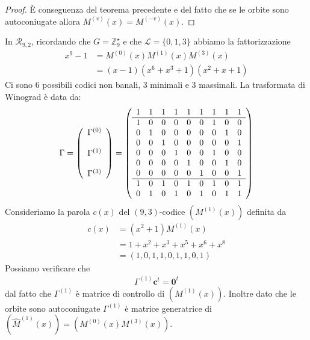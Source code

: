 \begin{proof}
    È conseguenza del teorema precedente e del fatto che se le orbite sono autoconiugate allora $M^{(v)}(x) = M^{(-v)}(x)$.
\end{proof}
\begin{esempio}
   In $\mathcal{R}_{9,2}$, ricordando che $ G = \mathbb{Z}_{9}^{\star}  $ e che $\mathscr{L} = \lbrace 0,1,3 \rbrace$ abbiamo la fattorizzazione
    \begin{align*}
      x^9 - 1 &= M^{(0)}(x) M^{(1)}(x) M^{(3)}(x) \\
	      &= (x-1)(x^6+x^3+1)(x^2+x+1)
    \end{align*}
   Ci sono $6$ possibili codici non banali, $3$ minimali e $3$ massimali.
   La trasformata di Winograd è data da:
   \begin{align*}
    \Gamma = 
     \left(
    \begin{array} { c }
    \Gamma^{(0)} \\ \\
    \Gamma^{(1)} \\ \\
    \Gamma^{(3)} 
    \end{array}
    \right)
    =
    \left(
    \begin{array} { c c c c c c c c c}
    1 & 1 & 1 & 1 & 1 & 1 & 1 & 1 & 1  \\
    \hline
    1 & 0 & 0 & 0 & 0 & 0 & 1 & 0 & 0  \\
    0 & 1 & 0 & 0 & 0 & 0 & 0 & 1 & 0  \\
    0 & 0 & 1 & 0 & 0 & 0 & 0 & 0 & 1 \\
    0 & 0 & 0 & 1 & 0 & 0 & 1 & 0 & 0 \\
    0 & 0 & 0 & 0 & 1 & 0 & 0 & 1 & 0 \\
    0 & 0 & 0 & 0 & 0 & 1 & 0 & 0 & 1 \\
    \hline
    1 & 0 & 1 & 0 & 1 & 0 & 1 & 0 & 1  \\
    0 & 1 & 0 & 1 & 0 & 1 & 0 & 1 & 1    
    \end{array}
    \right)
    \end{align*}
    Consideriamo la parola $c(x)$ del $(9,3)$-codice $(M^{(1)}(x))$ definita da 
    \begin{align*}
       c(x) &= (x^2 + 1)M^{(1)}(x) \\
            &= 1 + x^2 + x^3 + x^5 + x^6 + x^8 \\
            &= (1,0,1,1,0,1,1,0,1) 
    \end{align*}
    Possiamo verificare che 
    \begin{align*}
       \Gamma^{(1)} \mathbf{c}^{t} = \mathbf{0}^{t}
    \end{align*}
    dal fatto che $\Gamma^{(1)}$ è matrice di controllo di $(M^{(1)}(x))$. Inoltre dato che le orbite sono autoconiugate  $\Gamma^{(1)}$ è matrice generatrice di $(\hat{M}^{(1)}(x))=(M^{(0)}(x)M^{(3)}(x))$. 
\end{esempio}

